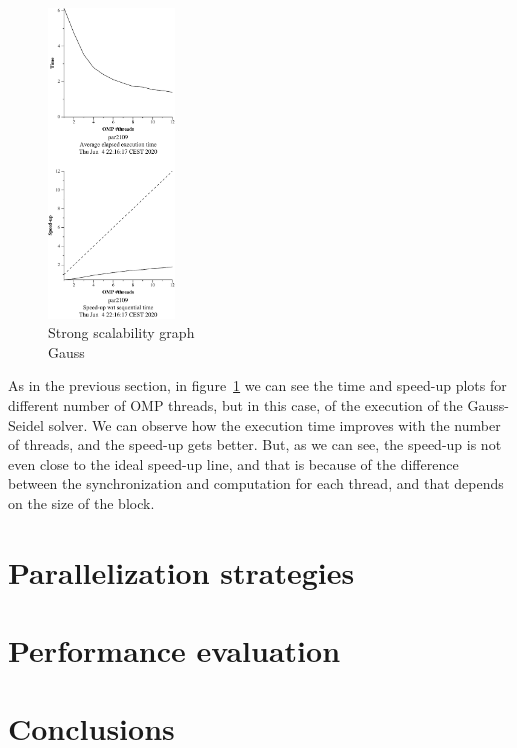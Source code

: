 
\begin{figure}[H]
    \centering
    \includegraphics[width=0.3\textwidth]{heat-omp-strong-gauss-crop}
    \caption{Strong scalability graph \\ Gauss}%
    \label{fig:strong-gauss}
\end{figure}

As in the previous section, in figure~\ref{fig:strong-gauss} we can see the time and speed-up plots for different number 
of OMP threads, but in this case, of the execution of the Gauss-Seidel solver. We can observe how the execution time improves with the number of threads, and the speed-up gets better. But, as we can see, the speed-up is not even close to the ideal speed-up line, and that is because of the difference between the synchronization and computation for each thread, and that depends on the size of the block.



\section{Parallelization strategies}%
\label{sec:parallelization_strategies}

\section{Performance evaluation}%
\label{sec:performance_evaluation}

\section{Conclusions}%
\label{sec:conclusions}







